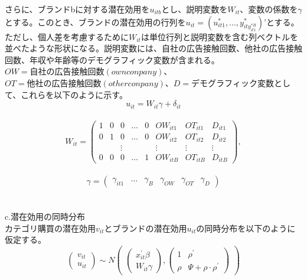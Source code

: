 \documentclass[11pt]{jsarticle}
\begin{document}
さらに、ブランドbに対する潜在効用を$u_{itb}$とし、説明変数を$W_{it}$、変数の係数を$\gamma$ とする。このとき、ブランドの潜在効用の行列を$u_{it} = (u_{it1}^{*},...,y_{ity_{it1}^{*B}}^{*})’$とする。ただし、個人差を考慮するために$W_{it}$は単位行列と説明変数を含む列ベクトルを並べたような形状になる。説明変数には、自社の広告接触回数、他社の広告接触回数、年収や年齢等のデモグラフィック変数が含まれる。$OW = 自社の広告接触回数(own conpany)$、$OT = 他社の広告接触回数(other conpany)$、$D =デモグラフィック変数$として、これらを以下のように示す。\\
\begin{equation} \label{formulab2}
u_{it} = W_{it}\gamma + \delta_{it}
\end{equation}\\
\begin{equation} \label{formulab3}
  W_{it} =
  \begin{pmatrix}
      1 & 0 & 0 & \ldots & 0 & OW_{it1} & OT_{it1} & D_{it1} \\
      0 & 1 & 0 & \ldots & 0 & OW_{it2} & OT_{it2} & D_{it2} \\
       &  & \vdots &  &  & \vdots & \vdots & \vdots \\
      0 & 0 & 0 & \ldots & 1 & OW_{itB} & OT_{itB} & D_{itB}
    \end{pmatrix}
    ,
\end{equation}\\
\begin{equation} \label{formulab4}
  \gamma =
  \begin{pmatrix}
      \gamma_{it1} & \ldots & \gamma_{B} & \gamma_{OW} & \gamma_{OT} & \gamma_{D}
   \end{pmatrix}
\end{equation}\\
\\
c.潜在効用の同時分布\\
カテゴリ購買の潜在効用$v_{it}$とブランドの潜在効用$u_{it}$の同時分布を以下のように仮定する。\\
\begin{equation} \label{formulac1}
  \begin{pmatrix}
      v_{it} \\
      u_{it} 
   \end{pmatrix}
   \sim N
  \begin{pmatrix}
    \begin{pmatrix}
    x^{\prime}_{it}\beta\\
    W_{it}\gamma
    \end{pmatrix}
    ,
    \begin{pmatrix}
    1 & \rho^\prime\\
    \rho & \Psi + \rho \cdot \rho^\prime
    \end{pmatrix}
  \end{pmatrix}
\end{equation}\\
\end{document}
